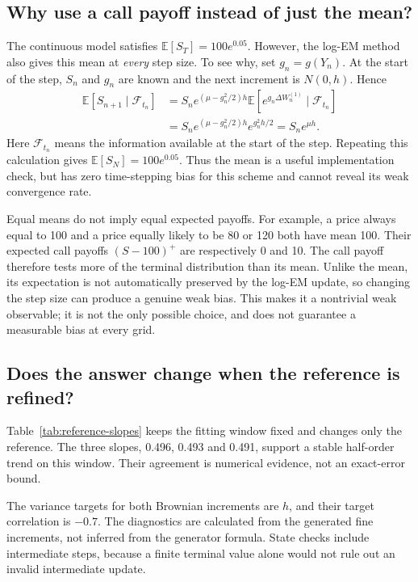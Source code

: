 \documentclass[11pt,a4paper]{article}
\begin{document}
\subsection{Why use a call payoff instead of just the mean?}
The continuous model satisfies $\mathbb E[S_T]=100e^{0.05}$. However, the log-EM method also gives this mean at \emph{every} step size. To see why, set $g_n=g(Y_n)$. At the start of the step, $S_n$ and $g_n$ are known and the next increment is $N(0,h)$. Hence
\begin{equation}\label{eq:mean-preservation}
\begin{aligned}
\mathbb E[S_{n+1}\mid\mathcal F_{t_n}]
&=S_n e^{(\mu-g_n^2/2)h}\mathbb E[e^{g_n\Delta W_n^{(1)}}\mid\mathcal F_{t_n}]\\
&=S_n e^{(\mu-g_n^2/2)h}e^{g_n^2h/2}=S_ne^{\mu h}.
\end{aligned}
\end{equation}
Here $\mathcal F_{t_n}$ means the information available at the start of the step. Repeating this calculation gives $\mathbb E[S_N]=100e^{0.05}$. Thus the mean is a useful implementation check, but has zero time-stepping bias for this scheme and cannot reveal its weak convergence rate.

Equal means do not imply equal expected payoffs. For example, a price always equal to 100 and a price equally likely to be 80 or 120 both have mean 100. Their expected call payoffs $(S-100)^+$ are respectively 0 and 10. The call payoff therefore tests more of the terminal distribution than its mean. Unlike the mean, its expectation is not automatically preserved by the log-EM update, so changing the step size can produce a genuine weak bias. This makes it a nontrivial weak observable; it is not the only possible choice, and does not guarantee a measurable bias at every grid.

\newpage
\subsection{Does the answer change when the reference is refined?}

\NAReferenceInterpretation{}

Table~\ref{tab:reference-slopes} keeps the fitting window fixed and changes only the reference. The three slopes, 0.496, 0.493 and 0.491, support a stable half-order trend on this window. Their agreement is numerical evidence, not an exact-error bound.
\begin{table}[H]\centering
\caption{Brownian and state diagnostics at the finest non-affine grid.}

\end{table}
The variance targets for both Brownian increments are $h$, and their target correlation is $-0.7$. The diagnostics are calculated from the generated fine increments, not inferred from the generator formula. State checks include intermediate steps, because a finite terminal value alone would not rule out an invalid intermediate update.
\end{document}
